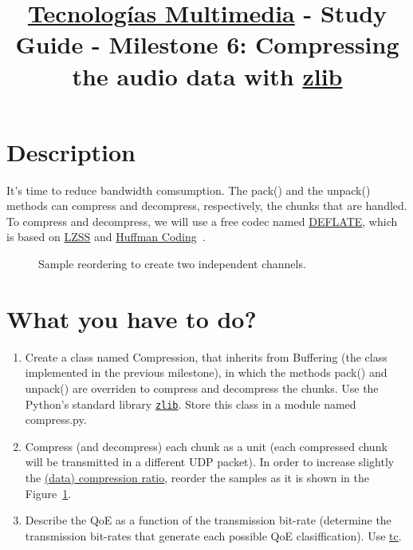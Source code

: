 \title{\href{https://www.ual.es/estudios/grados/presentacion/plandeestudios/asignatura/4015/40154321?idioma=zh_CN}{Tecnologías Multimedia} - Study Guide - Milestone 6: Compressing the audio data with \href{https://zlib.net/}{zlib}}

\maketitle

\section{Description}

It's time to reduce bandwidth comsumption. The pack() and the unpack()
methods can compress and decompress, respectively, the chunks that are
handled. To compress and decompress, we will use a free codec named
\href{https://en.wikipedia.org/wiki/DEFLATE}{DEFLATE}, which is based
on
\href{https://en.wikipedia.org/wiki/Lempel%E2%80%93Ziv%E2%80%93Storer%E2%80%93Szymanski}{LZSS}
  and \href{https://en.wikipedia.org/wiki/Huffman_coding}{Huffman
    Coding}~\cite{nelson96datacompression}.

\begin{figure}
  \begin{center}
  \end{center}
  \caption{Sample reordering to create two independent channels.}
  \label{fig:reordering}
\end{figure}

\section{What you have to do?}

\begin{enumerate}
  
\item Create a class named Compression, that inherits from
  Buffering (the class implemented in the previous milestone),
  in which the methods pack() and unpack() are
  overriden to compress and decompress the chunks. Use the Python's
  standard library
  \href{https://docs.python.org/3/library/zlib.html}{\texttt{zlib}}. Store
  this class in a module named compress.py.
  
\item Compress (and decompress) each chunk as a unit (each compressed
  chunk will be transmitted in a different UDP packet). In order to
  increase slightly the
  \href{https://en.wikipedia.org/wiki/Data_compression_ratio}{(data)
    compression ratio}, reorder the samples as it is shown in the
  Figure~\ref{fig:reordering}.

\item Describe the QoE as a function of the transmission bit-rate
  (determine the transmission bit-rates that generate each possible
  QoE clasiffication). Use
  \href{https://man7.org/linux/man-pages/man8/tc.8.html}{tc}.
\end{enumerate}

